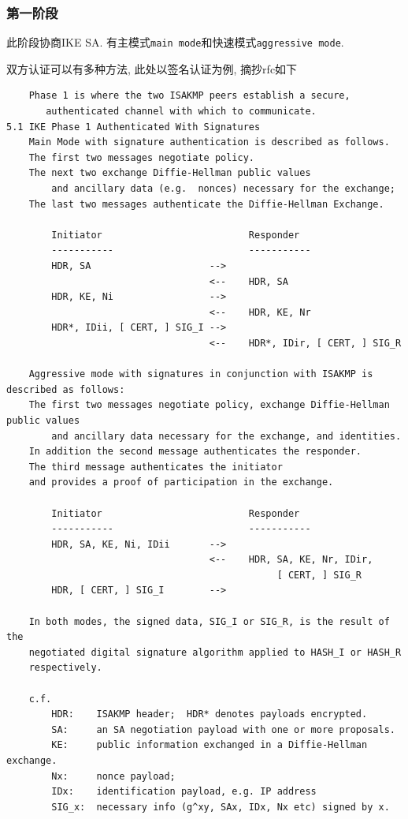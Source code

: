 \documentclass{ctexart}
\begin{document}
\subsubsection{第一阶段}
    此阶段协商IKE SA. 有主模式\verb/main mode/和快速模式\verb/aggressive mode/.\par
    双方认证可以有多种方法, 此处以签名认证为例, 摘抄rfc如下\begin{verbatim}
    Phase 1 is where the two ISAKMP peers establish a secure,
       authenticated channel with which to communicate.
5.1 IKE Phase 1 Authenticated With Signatures
    Main Mode with signature authentication is described as follows.
    The first two messages negotiate policy.
    The next two exchange Diffie-Hellman public values
        and ancillary data (e.g.  nonces) necessary for the exchange;
    The last two messages authenticate the Diffie-Hellman Exchange.

        Initiator                          Responder
        -----------                        -----------
        HDR, SA                     -->
                                    <--    HDR, SA
        HDR, KE, Ni                 -->
                                    <--    HDR, KE, Nr
        HDR*, IDii, [ CERT, ] SIG_I -->
                                    <--    HDR*, IDir, [ CERT, ] SIG_R

    Aggressive mode with signatures in conjunction with ISAKMP is described as follows:
    The first two messages negotiate policy, exchange Diffie-Hellman public values
        and ancillary data necessary for the exchange, and identities.
    In addition the second message authenticates the responder.
    The third message authenticates the initiator
    and provides a proof of participation in the exchange.

        Initiator                          Responder
        -----------                        -----------
        HDR, SA, KE, Ni, IDii       -->
                                    <--    HDR, SA, KE, Nr, IDir,
                                                [ CERT, ] SIG_R
        HDR, [ CERT, ] SIG_I        -->

    In both modes, the signed data, SIG_I or SIG_R, is the result of the
    negotiated digital signature algorithm applied to HASH_I or HASH_R
    respectively.

    c.f.
        HDR:    ISAKMP header;  HDR* denotes payloads encrypted.
        SA:     an SA negotiation payload with one or more proposals.
        KE:     public information exchanged in a Diffie-Hellman exchange.
        Nx:     nonce payload;  
        IDx:    identification payload, e.g. IP address
        SIG_x:  necessary info (g^xy, SAx, IDx, Nx etc) signed by x.
\end{verbatim}
\end{document}
